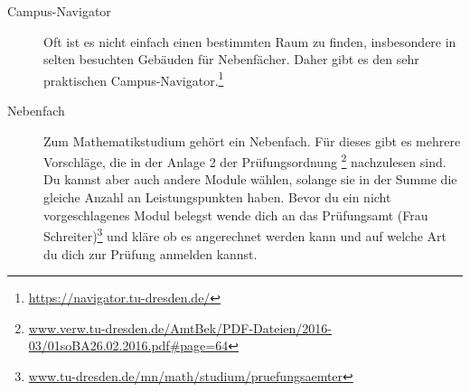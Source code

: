 \documentclass{scrartcl}
\begin{document}
\begin{description}
  \item[Campus-Navigator] Oft ist es nicht einfach einen bestimmten Raum zu finden,
    insbesondere in selten besuchten Gebäuden für Nebenfächer.
    Daher gibt es den sehr praktischen Campus-Navigator.\footnote{\url{https://navigator.tu-dresden.de/}}
  \item[Nebenfach] Zum Mathematikstudium gehört ein Nebenfach.
    Für dieses gibt es mehrere Vorschläge, die in der Anlage 2 der Prüfungsordnung
    \footnote{\url{www.verw.tu-dresden.de/AmtBek/PDF-Dateien/2016-03/01soBA26.02.2016.pdf\#page=64}}
    nachzulesen sind.
    Du kannst aber auch andere Module wählen, solange sie in der Summe
    die gleiche Anzahl an Leistungspunkten haben.
    Bevor du ein nicht vorgeschlagenes Modul belegst wende dich an
    das Prüfungsamt (Frau Schreiter)\footnote{\url{www.tu-dresden.de/mn/math/studium/pruefungsaemter}\label{pruefungsamt}}
    und kläre ob es angerechnet werden kann und auf welche Art
    du dich zur Prüfung anmelden kannst.


\end{description}
\end{document}
